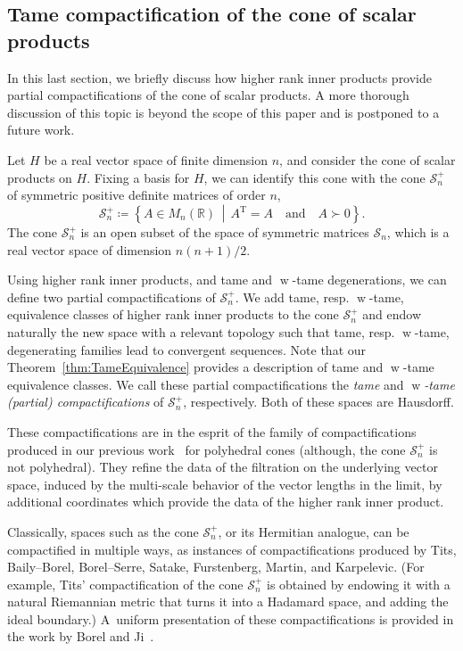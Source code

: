 \documentclass[AHL,Unicode,longabstracts]{cedram}
\DeclareMathOperator{\weak}{w}
\newcommand{\R}{\mathbb{R}}
\newcommand{\scS}{\mathscr{S}}
\newcommand{\transpose}{\mathrm{T}}
\begin{document}
\subsection{Tame compactification of the cone of scalar products} \label{sec:tame-compactifications}
In this last section, we briefly discuss how higher rank inner products provide partial compactifications of the cone of scalar products. A more thorough discussion of this topic is beyond the scope of this paper and is postponed to a future work.

Let $H$ be a real vector space of finite dimension $n$, and consider the cone of scalar products on $H$. Fixing a basis for $H$, we can identify this cone with the cone $\scS_n^+$ of symmetric positive definite matrices of order $n$,
\[
\scS^+_n \coloneqq \left\{A \in M_n(\R) \,\middle|\, A^\transpose=A \quad \text{and} \quad A \succ 0\right\}.
\]
The cone $\scS^+_n$ is an open subset of the space of symmetric matrices $\scS_n$, which is a real vector space of dimension $n(n+1)/2$.

Using higher rank inner products, and tame and $\weak$-tame degenerations, we can define two partial compactifications of $\scS^+_n$. We add tame, resp. $\weak$-tame, equivalence classes of higher rank inner products to the cone $\scS^+_n$ and endow naturally the new space with a relevant topology such that tame, resp. $\weak$-tame, degenerating families lead to convergent sequences. Note that our Theorem~\ref{thm:TameEquivalence} provides a description of tame and $\weak$-tame equivalence classes. We call these partial compactifications the \emph{tame} and \emph{$\weak$-tame (partial) compactifications} of $\scS^+_n$, respectively. Both of these spaces are Hausdorff.

These compactifications are in the esprit of the family of compactifications produced in our previous work~\cite{AN2} for polyhedral cones (although, the cone $\scS^+_n$ is not polyhedral). They refine the data of the filtration on the underlying vector space, induced by the multi-scale behavior of the vector lengths in the limit, by additional coordinates which provide the data of the higher rank inner product.


Classically, spaces such as the cone $\scS^+_n$, or its Hermitian analogue, can be compactified in multiple ways, as instances of compactifications produced by Tits, Baily--Borel, Borel--Serre, Satake, Furstenberg, Martin, and Karpelevic. (For example, Tits' compactification of the cone $\scS^+_n$ is obtained by endowing it with a natural Riemannian metric that turns it into a Hadamard space, and adding the ideal boundary.) A~uniform presentation of these compactifications is provided in the work by Borel and Ji~\cite{BJ06, BJ07}.
\end{document}

